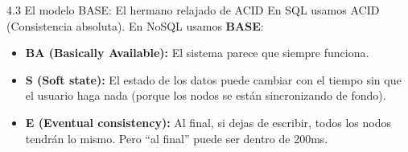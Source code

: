 \begin{frame}{4.3 El modelo BASE: El hermano relajado de ACID}
    En SQL usamos ACID (Consistencia absoluta). En NoSQL usamos \textbf{BASE}:
    
    \begin{itemize}
        \item \textbf{BA (Basically Available):} El sistema parece que siempre funciona.
        \item \textbf{S (Soft state):} El estado de los datos puede cambiar con el tiempo sin que el usuario haga nada (porque los nodos se están sincronizando de fondo).
        \item \textbf{E (Eventual consistency):} Al final, si dejas de escribir, todos los nodos tendrán lo mismo. Pero ``al final'' puede ser dentro de 200ms.
    \end{itemize}
    
\end{frame}
